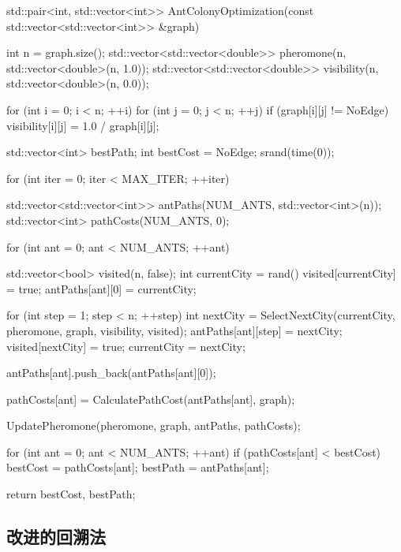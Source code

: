 \begin{cppcode}
std::pair<int, std::vector<int>> AntColonyOptimization(const std::vector<std::vector<int>> &graph) {
    int n = graph.size();
    std::vector<std::vector<double>> pheromone(n, std::vector<double>(n, 1.0));
    std::vector<std::vector<double>> visibility(n, std::vector<double>(n, 0.0));

    for (int i = 0; i < n; ++i) {
        for (int j = 0; j < n; ++j) {
            if (graph[i][j] != NoEdge) {
                visibility[i][j] = 1.0 / graph[i][j];
            }
        }
    }

    std::vector<int> bestPath;
    int bestCost = NoEdge;
    srand(time(0)); 

    for (int iter = 0; iter < MAX_ITER; ++iter) {
        std::vector<std::vector<int>> antPaths(NUM_ANTS, std::vector<int>(n));
        std::vector<int> pathCosts(NUM_ANTS, 0);

        for (int ant = 0; ant < NUM_ANTS; ++ant) {
            std::vector<bool> visited(n, false);
            int currentCity = rand() %
            visited[currentCity] = true;
            antPaths[ant][0] = currentCity;

            for (int step = 1; step < n; ++step) {
                int nextCity = SelectNextCity(currentCity, pheromone, graph, visibility, visited);
                antPaths[ant][step] = nextCity;
                visited[nextCity] = true;
                currentCity = nextCity;
            }

            antPaths[ant].push_back(antPaths[ant][0]);

            pathCosts[ant] = CalculatePathCost(antPaths[ant], graph);
        }

        UpdatePheromone(pheromone, graph, antPaths, pathCosts);

        for (int ant = 0; ant < NUM_ANTS; ++ant) {
            if (pathCosts[ant] < bestCost) {
                bestCost = pathCosts[ant];
                bestPath = antPaths[ant];
            }
        }
    }

    return {bestCost, bestPath};
}    
\end{cppcode}

\subsection{改进的回溯法}

